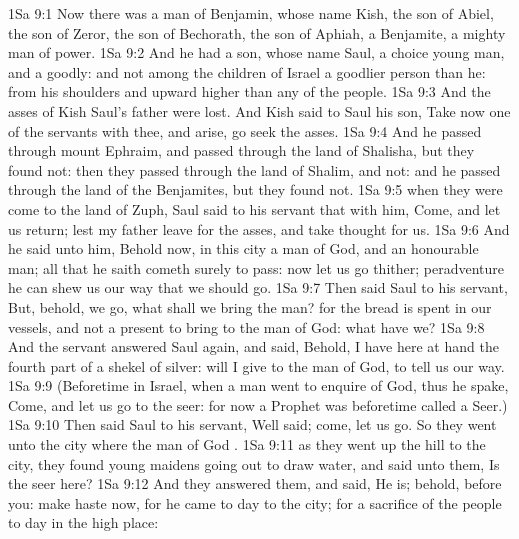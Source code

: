 \vs 1Sa 9:1 Now there was a man of Benjamin, whose name  Kish, the son of Abiel, the son of Zeror, the son of Bechorath, the son of Aphiah, a Benjamite, a mighty man of power.
\vs 1Sa 9:2 And he had a son, whose name  Saul, a choice young man, and a goodly: and  not among the children of Israel a goodlier person than he: from his shoulders and upward  higher than any of the people.
\vs 1Sa 9:3 And the asses of Kish Saul's father were lost. And Kish said to Saul his son, Take now one of the servants with thee, and arise, go seek the asses.
\vs 1Sa 9:4 And he passed through mount Ephraim, and passed through the land of Shalisha, but they found  not: then they passed through the land of Shalim, and  not: and he passed through the land of the Benjamites, but they found  not.
\vs 1Sa 9:5  when they were come to the land of Zuph, Saul said to his servant that  with him, Come, and let us return; lest my father leave  for the asses, and take thought for us.
\vs 1Sa 9:6 And he said unto him, Behold now,  in this city a man of God, and  an honourable man; all that he saith cometh surely to pass: now let us go thither; peradventure he can shew us our way that we should go.
\vs 1Sa 9:7 Then said Saul to his servant, But, behold,  we go, what shall we bring the man? for the bread is spent in our vessels, and  not a present to bring to the man of God: what have we?
\vs 1Sa 9:8 And the servant answered Saul again, and said, Behold, I have here at hand the fourth part of a shekel of silver:  will I give to the man of God, to tell us our way.
\vs 1Sa 9:9 (Beforetime in Israel, when a man went to enquire of God, thus he spake, Come, and let us go to the seer: for  now  a Prophet was beforetime called a Seer.)
\vs 1Sa 9:10 Then said Saul to his servant, Well said; come, let us go. So they went unto the city where the man of God .
\vs 1Sa 9:11  as they went up the hill to the city, they found young maidens going out to draw water, and said unto them, Is the seer here?
\vs 1Sa 9:12 And they answered them, and said, He is; behold,  before you: make haste now, for he came to day to the city; for  a sacrifice of the people to day in the high place:
